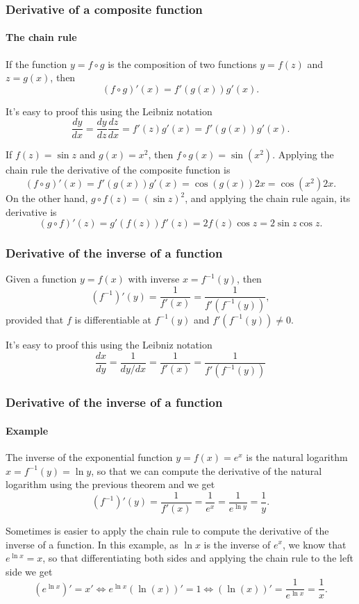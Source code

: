 \begin{frame}
\frametitle{Derivative of a composite function}
\framesubtitle{The chain rule}
\begin{theorem} If the function $y=f\circ g$ is the composition of two functions $y=f(z)$ and $z=g(x)$, then
\[ 
(f\circ g)'(x)=f'(g(x))g'(x).
\]
\end{theorem}

It's easy to proof this using the Leibniz notation
\[
\frac{dy}{dx}=\frac{dy}{dz}\frac{dz}{dx}=f'(z)g'(x)=f'(g(x))g'(x).
\]

 If $f(z)=\sin z$ and $g(x)=x^2$, then $f\circ g(x)=\sin(x^2)$. Applying the chain rule the derivative of the composite function is
\[
(f\circ g)'(x)=f'(g(x))g'(x) = \cos(g(x)) 2x = \cos(x^2)2x.
\]
On the other hand, $g\circ f(z)= (\sin z)^2$, and applying the chain rule again, its derivative is
\[
(g\circ f)'(z)=g'(f(z))f'(z) = 2f(z)\cos z = 2\sin z\cos z.
\]
\end{frame}


\begin{frame}
\frametitle{Derivative of the inverse of a function}
\begin{theorem}
Given a function $y=f(x)$ with inverse $x=f^{-1}(y)$, then 
\[
\left(f^{-1}\right)'(y)=\frac{1}{f'(x)}=\frac{1}{f'(f^{-1}(y))},
\]
provided that $f$ is differentiable at $f^{-1}(y)$ and $f'(f^{-1}(y))\neq 0$.
\end{theorem}

It's easy to proof this using the Leibniz notation
\[
\frac{dx}{dy}=\frac{1}{dy/dx}=\frac{1}{f'(x)}=\frac{1}{f'(f^{-1}(y))}
\]
\end{frame}


\begin{frame}
\frametitle{Derivative of the inverse of a function}
\framesubtitle{Example}
The inverse of the exponential function $y=f(x)=e^x$ is the natural logarithm $x=f^{-1}(y)=\ln y$, so that we can compute the derivative of the natural logarithm using the previous theorem and we get
\[
\left(f^{-1}\right)'(y)=\frac{1}{f'(x)}=\frac{1}{e^x}=\frac{1}{e^{\ln y}}=\frac{1}{y}.
\]

 Sometimes is easier to apply the chain rule to compute the derivative of the inverse of a function. 
In this example, as $\ln x$ is the inverse of $e^x$, we know that $e^{\ln x}=x$, so that differentiating both sides and applying the chain rule to the left side we get
\[
(e^{\ln x})'=x' \Leftrightarrow e^{\ln x}(\ln(x))' = 1 \Leftrightarrow (\ln(x))'=\frac{1}{e^{\ln x}}=\frac{1}{x}.
\]
\end{frame}



